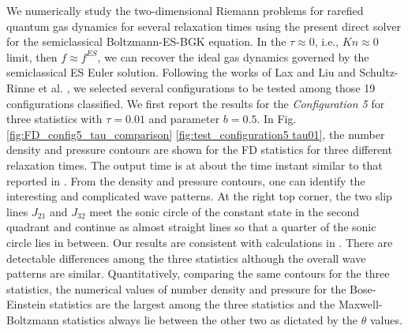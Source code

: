 \documentclass[twoside,twocolumn,prc,floats,amsmath,amssymb]{revtex4} %
\begin{document}
We numerically study the two-dimensional Riemann problems for rarefied quantum gas dynamics for several relaxation times using the present direct solver for the semiclassical Boltzmann-ES-BGK equation.   In the $\tau \approx 0$, i.e.,  $Kn \approx 0$ limit, then $f \approx f^{ES}$, we can recover the ideal gas dynamics governed by the semiclassical ES Euler solution.  Following the works of Lax and Liu \cite{Laxliu95} and Schultz-Rinne et al. \cite{schultzrinne},  we selected several configurations to be tested among those 19 configurations classified.  We first report the results for the \emph{Configuration 5} for three statistics with $\tau=0.01$ and parameter $b=0.5$. In Fig. \ref{fig:FD_config5_tau_comparison} \ref{fig:test_configuration5 tau01}, the number density and pressure contours are shown for the FD statistics for three different relaxation times.  The output time is at about the time instant similar to that reported in \cite{Laxliu95}\cite{schultzrinne}.  From the density and pressure contours, one can identify the interesting and complicated wave patterns.   At the right top corner, the two slip lines $J_{21}$ and $J_{32}$ meet the sonic circle of the constant state in the second quadrant and continue as almost straight lines so that a quarter of the sonic circle lies in between.  Our results are consistent with calculations in \cite{Laxliu95}\cite{schultzrinne}.  There are detectable differences among the three statistics although the overall wave patterns are similar. Quantitatively, comparing the same contours for the three statistics, the numerical values of number density and pressure for the Bose-Einstein statistics are the largest among the three statistics and the Maxwell-Boltzmann statistics always lie between the other two as dictated by the $\theta$ values.
\end{document}
